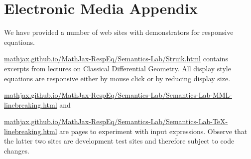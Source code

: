 \documentclass{llncs}
\begin{document}
\section*{Electronic Media Appendix}

We have provided a number of web sites with demonstrators for responsive
equations.

\noindent\href{http://mathjax.github.io/MathJax-RespEq/Semantics-Lab/Struik.html}{mathjax.github.io/MathJax-RespEq/Semantics-Lab/Struik.html} contains excerpts from 
lectures on Classical Differential Geometry. All display style equations are
responsive either by mouse click or by reducing display size.


\noindent\href{http://mathjax.github.io/MathJax-RespEq/Semantics-Lab/Semantics-Lab-MML-linebreaking.html}{mathjax.github.io/MathJax-RespEq/Semantics-Lab/Semantics-Lab-MML-linebreaking.html} and 

\noindent\href{http://mathjax.github.io/MathJax-RespEq/Semantics-Lab/Semantics-Lab-TeX-linebreaking.html}{mathjax.github.io/MathJax-RespEq/Semantics-Lab/Semantics-Lab-TeX-linebreaking.html}
are pages to experiment with input expressions.
Observe that the latter two sites are development test sites and therefore
subject to code changes.


\end{document}
